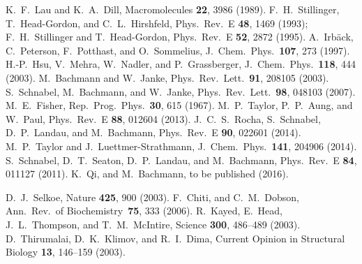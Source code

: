 K.~F.\ Lau and K.~A.\ Dill, Macromolecules \textbf{22}, 3986 (1989).
%
F.~H.\ Stillinger, T.~Head-Gordon, and C.~L.\ Hirshfeld, Phys.\ Rev.~E
\textbf{48}, 1469 (1993);
%
F.~H.\ Stillinger and T.~Head-Gordon, Phys.\ Rev.~E \textbf{52}, 2872
(1995).
%
A.~Irb\"ack, C.~Peterson, F.~Potthast, and O.~Sommelius, J.~Chem.\
Phys.\ \textbf{107}, 273 (1997).
%
H.-P.\ Hsu, V.~Mehra, W.~Nadler, and P.~Grassberger, J.~Chem.\ Phys.\
\textbf{118}, 444 (2003).
% 
M.~Bachmann and W.~Janke, Phys.\ Rev.\ Lett.\ \textbf{91}, 208105 (2003).
% 
\bibitem{ssbj1}
S.~Schnabel, M.~Bachmann, and W.~Janke, Phys.\ Rev.\ Lett.\ \textbf{98},
048103 (2007).
% 
M.~E.\ Fisher, Rep.\ Prog.\ Phys.\ \textbf{30}, 615 (1967).
%
M.~P.\ Taylor, P.~P.\ Aung, and W.~Paul, Phys.\ Rev.\ E \textbf{88}, 012604
(2013).
%
J.~C.~S.\ Rocha, S.~Schnabel, D.~P.\ Landau, and M.~Bachmann, Phys.\ Rev.~E
\textbf{90}, 022601 (2014).
%
M.~P.\ Taylor and J.~Luettmer-Strathmann, J.~Chem.\ Phys.\ \textbf{141},
204906 (2014). 
%
S.~Schnabel, D.~T.\ Seaton, D.~P.\ Landau, and M.~Bachmann, Phys.\ Rev.~E
\textbf{84}, 011127 (2011). 
%
K.~Qi, and M.~Bachmann, to be published (2016).
%


%
D.~J.\ Selkoe, Nature \textbf{425}, 900 (2003).
%
F.~Chiti, and C.~M.\ Dobson, Ann.\ Rev.\ of Biochemistry\
\textbf{75}, 333 (2006).  
%
\bibitem{Kayed2003}
R.~Kayed, E.~Head, J.~L.~Thompson, and T.~M.~McIntire, Science \textbf{300}, 486--489 (2003).
%
\bibitem{Thirumalai}
D.~Thirumalai, D.~K.~Klimov, and R.~I.~Dima, Current Opinion in Structural Biology \textbf{13}, 146--159 (2003).
%

